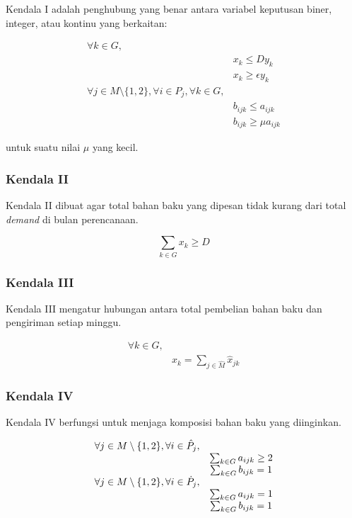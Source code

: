 \documentclass[
  12pt,
]{article}
\begin{document}
Kendala I adalah penghubung yang benar antara variabel keputusan biner,
integer, atau kontinu yang berkaitan:

\[\begin{matrix}
\forall k \in G, &  \\
 & x_k \leq Dy_k \\
 & x_k \geq \epsilon y_k \\
\forall j \in M \setminus \{ 1,2 \}, \forall i \in P_j, \forall k \in G, & \\
 & b_{ijk} \leq a_{ijk} \\
 & b_{ijk} \geq \mu a_{ijk}
\end{matrix}\]

untuk suatu nilai \(\mu\) yang kecil.

\hypertarget{kendala-ii}{%
\subsubsection*{Kendala II}\label{kendala-ii}}

Kendala II dibuat agar total bahan baku yang dipesan tidak kurang dari
total \emph{demand} di bulan perencanaan.

\[\sum_{k \in G} x_k \geq D\]

\hypertarget{kendala-iii}{%
\subsubsection*{Kendala III}\label{kendala-iii}}

Kendala III mengatur hubungan antara total pembelian bahan baku dan
pengiriman setiap minggu.

\[\begin{matrix}
\forall k \in G, & \\
 & x_k = \sum_{j \in \hat{M}} \hat{x}_{jk}
\end{matrix}\]

\hypertarget{kendala-iv}{%
\subsubsection*{Kendala IV}\label{kendala-iv}}

Kendala IV berfungsi untuk menjaga komposisi bahan baku yang diinginkan.

\[\begin{matrix}
\forall j \in M \setminus \{ 1,2 \}, \space \forall i \in \hat{P}_j, & \\
 & \sum_{k \in G} a_{ijk} \geq 2 \\
 & \sum_{k \in G} b_{ijk} = 1 \\
\forall j \in M \setminus \{ 1,2 \}, \space \forall i \in \dot{P}_j, & \\ 
 & \sum_{k \in G} a_{ijk} = 1 \\
 & \sum_{k \in G} b_{ijk} = 1
\end{matrix}\]
\end{document}

